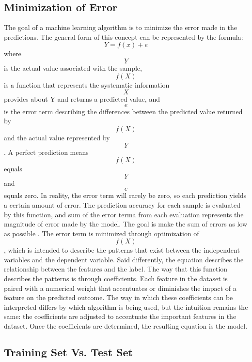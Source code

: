 \documentclass[sigconf]{acmart}
\begin{document}
\subsection{Minimization of Error}

The goal of a machine learning algorithm is to minimize the error made in the predictions. The general form of this concept can be represented by the formula:
\[
Y = f(x) + e
\]
where \[Y\] is the actual value associated with the sample, \[f(X)\] is a function that represents the systematic information \[X\] provides about Y and returns a predicted value, and \[e\] is the error term describing the differences between the predicted value returned by \[f(X)\] and the actual value represented by \[Y\]. A perfect prediction means \[f(X)\] equals \[Y\] and \[e\] equals zero. In reality, the error term will rarely be zero, so each prediction yields a certain amount of error. The prediction accuracy for each sample is evaluated by this function, and sum of the error terma from each evaluation represents the magnitude of error made by the model. The goal is make the sum of errors as low as possible \cite{cite08}.
The error term is minimized through optimization of \[f(X)\], which is intended to describe the patterns that exist between the independent variables and the dependent variable. Said differently, the equation describes the relationship between the features and the label. The way that this function describes the  patterns is through coefficients. Each feature in the dataset is paired with a numerical weight that accentuates or diminishes the impact of a feature on the predicted outcome. The way in which these coefficients can be interpreted differs by which algorithm is being used, but the intuition remains the same: the coefficients are adjusted to accentuate the important features in the dataset. Once the coefficients are determined, the resulting equation is the model.

\subsection{Training Set Vs. Test Set}
\end{document}
